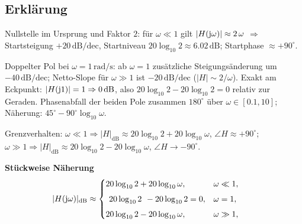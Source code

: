 \subsection{Erklärung}
\vspace{5mm}
\begin{description}[leftmargin=1.2em,labelsep=.6em,font=\bfseries]
\item[Schritt 1] Nullstelle im Ursprung und Faktor $2$: für $\omega\ll1$ gilt $|H(\operatorname{j}\!\omega)|\approx 2\,\omega$ $\Rightarrow$ Startsteigung $+20\,\mathrm{dB/dec}$, Startniveau $20\log_{10}2\approx6.02\,\mathrm{dB}$; Startphase $\approx+90^\circ$.
\item[Schritt 2] Doppelter Pol bei $\omega=1\,\mathrm{rad/s}$: ab $\omega=1$ zusätzliche Steigungsänderung um $-40\,\mathrm{dB/dec}$; Netto-Slope für $\omega\gg1$ ist $-20\,\mathrm{dB/dec}$ ($|H|\sim 2/\omega$). Exakt am Eckpunkt: $|H(\operatorname{j}\!1)|=1\Rightarrow 0\,\mathrm{dB}$, also $20\log_{10}2-20\log_{10}2=0$ relativ zur Geraden. Phasenabfall der beiden Pole zusammen $180^\circ$ über $\omega\in[0.1,10]$; Näherung: $45^\circ-90^\circ\log_{10}\omega$.
\item[Schritt 3] Grenzverhalten: $\omega\ll1\Rightarrow |H|_{\mathrm{dB}}\approx 20\log_{10}2+20\log_{10}\omega$, $\angle H\approx+90^\circ$; $\omega\gg1\Rightarrow |H|_{\mathrm{dB}}\approx 20\log_{10}2-20\log_{10}\omega$, $\angle H\to-90^\circ$.
\end{description}

\vspace{0.5cm}
\medskip
\noindent\textbf{Stückweise Näherung}
\[
|H(\operatorname{j}\!\omega)|_{\mathrm{dB}}\approx
\begin{cases}
20\log_{10}2+20\log_{10}\omega,& \omega\ll1,\\[4pt]
\left.\;20\log_{10}2\;\right.-20\log_{10}2=0,& \omega=1,\\[4pt]
20\log_{10}2-20\log_{10}\omega,& \omega\gg1,
\end{cases}
\qquad
\]
\newpage